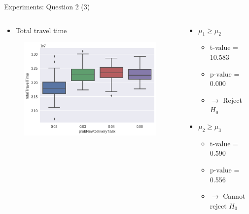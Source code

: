 \begin{frame}{Experiments: Question 2 (3)}
    \begin{columns}

        \begin{column}{0.5\textwidth}
            \begin{itemize}
                \item Total travel time
            \end{itemize}

            \begin{figure}[hbt]
                \includegraphics[width=1.1\textwidth]{img/question2-plot2}
            \end{figure}
        \end{column}

        \begin{column}{0.5\textwidth}
            \begin{itemize}
                \item $\mu_1 \geq \mu_2$
                    \begin{itemize}
                        \item t-value = 10.583
                        \item p-value = 0.000
                        \item $\rightarrow$ Reject $H_0$
                    \end{itemize}

                \item $\mu_2 \geq \mu_3$
                    \begin{itemize}
                        \item t-value = 0.590
                        \item p-value = 0.556
                        \item $\rightarrow$ Cannot reject $H_0$
                    \end{itemize}


\end{itemize}
\end{column}
\end{columns}
\end{frame}
